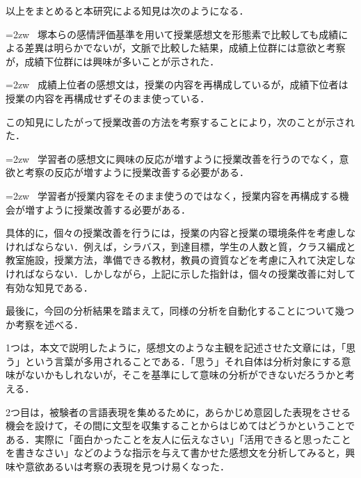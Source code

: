 \documentclass[japanese]{jnlp_1.3a}
\begin{document}
以上をまとめると本研究による知見は次のようになる．

\vspace{\baselineskip}

\hangindent=2zw
\textbullet~塚本らの感情評価基準を用いて授業感想文を形態素で比較しても成績による差異は明らかでないが，文脈で比較した結果，成績上位群には意欲と考察が，成績下位群には興味が多いことが示された．

\hangindent=2zw
\textbullet~成績上位者の感想文は，授業の内容を再構成しているが，成績下位者は授業の内容を再構成せずそのまま使っている．

\vspace{\baselineskip}

この知見にしたがって授業改善の方法を考察することにより，次のことが示された．

\vspace{\baselineskip}

\hangindent=2zw
\textbullet~学習者の感想文に興味の反応が増すように授業改善を行うのでなく，意欲と考察の反応が増すように授業改善する必要がある． 

\hangindent=2zw
\textbullet~学習者が授業内容をそのまま使うのではなく，授業内容を再構成する機会が増すように授業改善する必要がある．

\vspace{\baselineskip}

具体的に，個々の授業改善を行うには，授業の内容と授業の環境条件を考慮しなければならない．例えば，シラバス，到達目標，学生の人数と質，クラス編成と教室施設，授業方法，準備できる教材，教員の資質などを考慮に入れて決定しなければならない．しかしながら，上記に示した指針は，個々の授業改善に対して有効な知見である．

\vspace{\baselineskip}

最後に，今回の分析結果を踏まえて，同様の分析を自動化することについて幾つか考察を述べる．

1つは，本文で説明したように，感想文のような主観を記述させた文章には，「思う」という言葉が多用されることである．「思う」それ自体は分析対象にする意味がないかもしれないが，そこを基準にして意味の分析ができないだろうかと考える．

2つ目は，被験者の言語表現を集めるために，あらかじめ意図した表現をさせる機会を設けて，その間に文型を収集することからはじめてはどうかということである．実際に「面白かったことを友人に伝えなさい」「活用できると思ったことを書きなさい」などのような指示を与えて書かせた感想文を分析してみると，興味や意欲あるいは考察の表現を見つけ易くなった．
\end{document}
